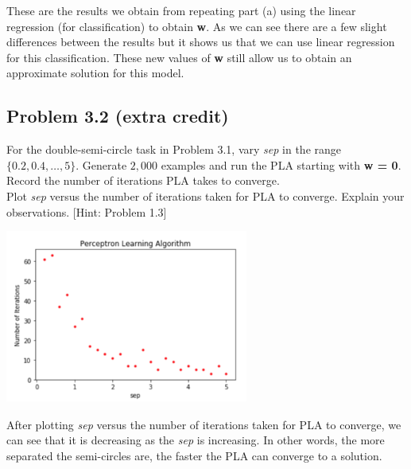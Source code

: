 \documentclass[a4paper]{article}
\begin{document}
\begin{itemize}
\begin{center}
    \end{center}
    These are the results we obtain from repeating part (a) using the linear regression (for 
    classification) to obtain \textbf{w}.  As we can see there are a few slight differences 
    between the results but it shows us that we can use linear regression for this classification.  
    These new values of \textbf{w} still allow us to obtain an approximate solution for this model.

\end{itemize}


\subsection{Problem 3.2 (extra credit)} For the double-semi-circle task in Problem 3.1, vary 
\textit{sep} in the range $\{0.2, 0.4, \ldots, 5\}$.  Generate $2,000$ examples and run the PLA 
starting with \textbf{w = 0}.  Record the number of iterations PLA takes to converge.\\
Plot \textit{sep} versus the number of iterations taken for PLA to converge.  Explain your 
observations.  [Hint: Problem 1.3]

\begin{center}
    \includegraphics[width=0.6\textwidth]{3-2.jpg}
\end{center}
After plotting \textit{sep} versus the number of iterations taken for PLA to converge, we can see 
that it is decreasing as the \textit{sep} is increasing.  In other words, the more separated the 
semi-circles are, the faster the PLA can converge to a solution.
\end{document}
